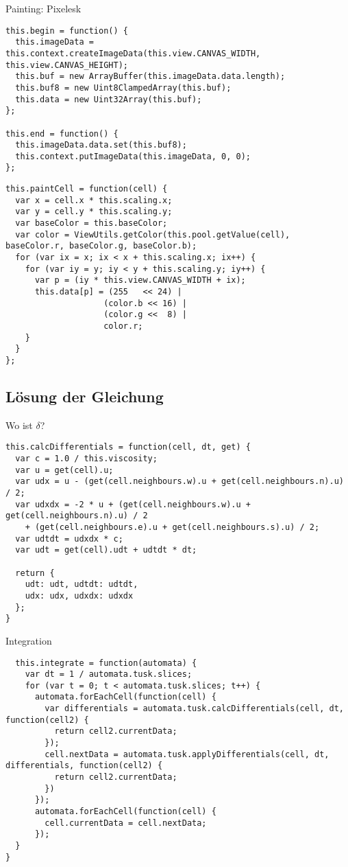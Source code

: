 \documentclass{beamer}
\begin{document}
\begin{frame}[fragile]{Painting: Pixelesk}
\begin{lstlisting}
this.begin = function() {
  this.imageData = this.context.createImageData(this.view.CANVAS_WIDTH, this.view.CANVAS_HEIGHT);
  this.buf = new ArrayBuffer(this.imageData.data.length);
  this.buf8 = new Uint8ClampedArray(this.buf);
  this.data = new Uint32Array(this.buf);
};
	
this.end = function() {
  this.imageData.data.set(this.buf8);
  this.context.putImageData(this.imageData, 0, 0);
};
\end{lstlisting}
\end{frame}
\begin{frame}[fragile]
\begin{lstlisting}
this.paintCell = function(cell) {
  var x = cell.x * this.scaling.x;
  var y = cell.y * this.scaling.y;		
  var baseColor = this.baseColor;
  var color = ViewUtils.getColor(this.pool.getValue(cell), baseColor.r, baseColor.g, baseColor.b);
  for (var ix = x; ix < x + this.scaling.x; ix++) {
    for (var iy = y; iy < y + this.scaling.y; iy++) {
      var p = (iy * this.view.CANVAS_WIDTH + ix);			
      this.data[p] = (255   << 24) |
            		(color.b << 16) |
            		(color.g <<  8) |
             		color.r;
    }
  }
};
\end{lstlisting}
\end{frame}

\subsection{Lösung der Gleichung}

\begin{frame}[fragile]{Wo ist $\delta$?}
\begin{lstlisting}
this.calcDifferentials = function(cell, dt, get) {
  var c = 1.0 / this.viscosity;
  var u = get(cell).u;		
  var udx = u - (get(cell.neighbours.w).u + get(cell.neighbours.n).u) / 2;
  var udxdx = -2 * u + (get(cell.neighbours.w).u + get(cell.neighbours.n).u) / 2
    + (get(cell.neighbours.e).u + get(cell.neighbours.s).u) / 2;	
  var udtdt = udxdx * c;
  var udt = get(cell).udt + udtdt * dt;
		
  return {
    udt: udt, udtdt: udtdt,			
    udx: udx, udxdx: udxdx
  };
}
\end{lstlisting}
\end{frame}

\begin{frame}[fragile]{Integration}
\begin{lstlisting}
  this.integrate = function(automata) {
    var dt = 1 / automata.tusk.slices;
    for (var t = 0; t < automata.tusk.slices; t++) {		
      automata.forEachCell(function(cell) {
        var differentials = automata.tusk.calcDifferentials(cell, dt, function(cell2) {
          return cell2.currentData;
        });
        cell.nextData = automata.tusk.applyDifferentials(cell, dt, differentials, function(cell2) {
          return cell2.currentData;
        })
      });
      automata.forEachCell(function(cell) {
        cell.currentData = cell.nextData;
      });
  }
}
\end{lstlisting}
\end{frame}
\end{document}
